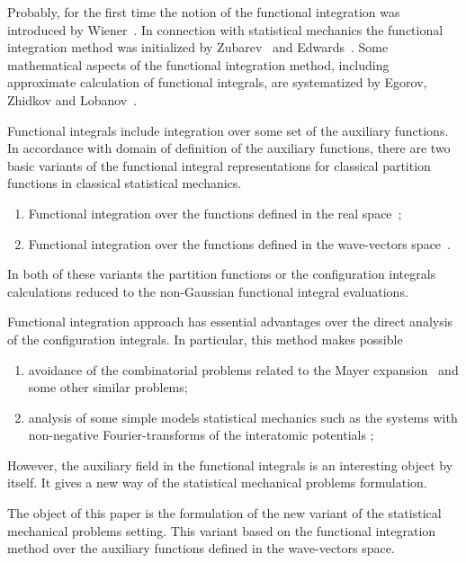 \documentclass[aps,pre,preprint,floatfix,twoside,tightenlines,showpacs,
showkeys]{revtex4}
\begin{document}
Probably, for the first time the notion of the functional integration was introduced by Wiener~\cite{Wie}. In connection with statistical mechanics the functional integration method was initialized by Zubarev~\cite{Zub} and Edwards~\cite{Edw}. Some mathematical aspects  of the functional integration method, including approximate calculation of functional integrals,  are systematized by Egorov, Zhidkov and Lobanov~\cite{Ego}.

Functional integrals include integration over some set of the auxiliary functions. In accordance with domain of definition of the auxiliary functions, there are two basic variants of the functional integral representations for classical partition functions in classical statistical mechanics.
\begin{enumerate}
    \item Functional integration over the functions defined in the real space~\cite{Edw,Iva1,Iva2};
    \item Functional integration over the functions defined in the wave-vectors space~\cite{Zub,Ami,Par,Zak1}.
\end{enumerate}
%
In both of these variants the partition functions or the configuration integrals calculations reduced to the non-Gaussian functional integral evaluations. 

Functional integration approach has essential advantages over the direct analysis of the configuration integrals. In particular, this method makes possible
\begin{enumerate}
    \item  avoidance of the combinatorial problems related to the Mayer expansion~\cite{Iva2,Par} and some other similar problems;
    \item analysis of some simple models statistical mechanics such as the systems with non-negative Fourier-transforms of the interatomic potentials \cite{Zak2,Efi,Bae1,Bae2}; 
\end{enumerate}
%
However, the auxiliary field in the functional integrals is an interesting object by itself. It gives a new way of the statistical mechanical problems formulation. 








The object of this paper is the formulation of the new variant of the statistical mechanical problems setting. This variant based on the functional integration method over the auxiliary functions defined in the wave-vectors space.
\end{document}
